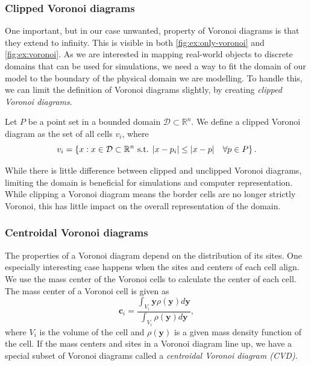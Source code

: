 \subsubsection{Clipped Voronoi diagrams}
One important, but in our case unwanted, property of Voronoi diagrams is that they extend to infinity. This is visible in both \autoref{fig:ex:only-voronoi} and \autoref{fig:ex:voronoi}. As we are interested in mapping real-world objects to discrete domains that can be used for simulations, we need a way to fit the domain of our model to the boundary of the physical domain we are modelling. To handle this, we can limit the definition of Voronoi diagrams slightly, by creating \emph{clipped Voronoi diagrams}.

\begin{definition}
Let $P$ be a point set in a bounded domain $\mathcal{D} \subset \mathbb{R}^n$. We define a clipped Voronoi diagram as the set of all cells $v_i$, where
\begin{equation}
\label{eq:clipped-voronoi}
    v_i = \left\{ x : x \in \mathcal{D}\subset \mathbb{R}^n \text{ s.t. } \lvert x - p_i\rvert \leq \lvert x - p\rvert\quad \forall p \in P \right\}.
\end{equation}
\end{definition}

While there is little difference between clipped and unclipped Voronoi diagrams, limiting the domain is beneficial for simulations and computer representation. While clipping a Voronoi diagram means the border cells are no longer strictly Voronoi, this has little impact on the overall representation of the domain.

\subsubsection{Centroidal Voronoi diagrams}
\label{sec:CVD}
The properties of a Voronoi diagram depend on the distribution of its sites. One especially interesting case happens when the sites and centers of each cell align. We use the mass center of the Voronoi cells to calculate the center of each cell. The mass center of a Voronoi cell is given as
\begin{equation}
    \mathbf{c}_i = \frac
        {\int_{V_i} \mathbf{y} \rho(\mathbf{y}) d\mathbf{y}}
        {\int_{V_i} \rho(\mathbf{y}) d\mathbf{y}},
\end{equation}
where $V_i$ is the volume of the cell and $\rho(\mathbf{y})$ is a given mass density function of the cell. If the mass centers and sites in a Voronoi diagram line up, we have a special subset of Voronoi diagrams called a \emph{centroidal Voronoi diagram (CVD)}.

